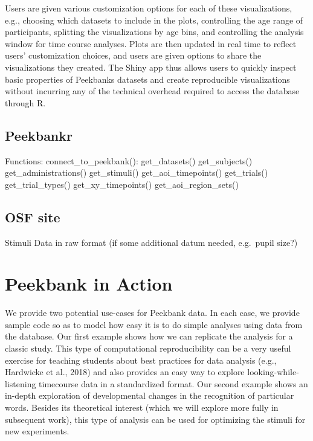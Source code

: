 \documentclass[
  english,
  man,floatsintext]{apa6}
\begin{document}
Users are given various customization options for each of these visualizations, e.g., choosing which datasets to include in the plots, controlling the age range of participants, splitting the visualizations by age bins, and controlling the analysis window for time course analyses.
Plots are then updated in real time to reflect users' customization choices, and users are given options to share the visualizations they created.
The Shiny app thus allows users to quickly inspect basic properties of Peekbanks datasets and create reproducible visualizations without incurring any of the technical overhead required to access the database through R.

\hypertarget{peekbankr}{%
\subsection{Peekbankr}\label{peekbankr}}

Functions: connect\_to\_peekbank(): get\_datasets() get\_subjects() get\_administrations() get\_stimuli() get\_aoi\_timepoints() get\_trials() get\_trial\_types() get\_xy\_timepoints() get\_aoi\_region\_sets()

\hypertarget{osf-site}{%
\subsection{OSF site}\label{osf-site}}

Stimuli Data in raw format (if some additional datum needed, e.g.~pupil size?)

\hypertarget{peekbank-in-action}{%
\section{Peekbank in Action}\label{peekbank-in-action}}

We provide two potential use-cases for Peekbank data. In each case, we provide sample code so as to model how easy it is to do simple analyses using data from the database. Our first example shows how we can replicate the analysis for a classic study. This type of computational reproducibility can be a very useful exercise for teaching students about best practices for data analysis (e.g., Hardwicke et al., 2018) and also provides an easy way to explore looking-while-listening timecourse data in a standardized format. Our second example shows an in-depth exploration of developmental changes in the recognition of particular words. Besides its theoretical interest (which we will explore more fully in subsequent work), this type of analysis can be used for optimizing the stimuli for new experiments.
\end{document}
